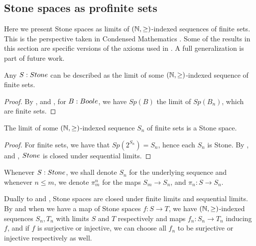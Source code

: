 
\subsection{Stone spaces as profinite sets}
Here we present Stone spaces as limits of $(\mathbb{N},\geq)$-indexed sequences of finite sets. 
This is the perspective taken in Condensed Mathematics \cite{Condensed,Dagur,Scholze}.
Some of the results in this section are specific versions of the axioms used in 
\cite{bc24}. A full generalization is part of future work. 
\begin{lemma}
  Any $S:\Stone$ can be described as the limit of some $(\mathbb{N},\geq)$-indexed sequence of 
  finite sets. 
\end{lemma}
\begin{proof}
  By ,  and , 
  for $B:\Boole$, we have $Sp(B)$ the limit of $Sp(B_n)$, which are finite sets. 
\end{proof}
\begin{lemma}\label{StoneAreProfinite}
  The limit of some $(\mathbb{N},\geq)$-indexed sequence $S_n$ of finite sets is a Stone space. 
\end{lemma}
\begin{proof}
  For finite sets, we have that $Sp(2^{S_n}) = S_n$, hence each $S_n$ is Stone. 
  By ,  and , 
  $\Stone$ is closed under sequential limits.
\end{proof}
\begin{remark}
  Whenever $S:\Stone$, we shall denote $S_n$ for the underlying sequence 
  and whenever $n\leq m$, we denote $\pi_m^n$ for the maps $S_m \to S_n$, 
  and $\pi_n:S\to S_n$. 
\end{remark}
\begin{remark}\label{StoneClosedUnderPullback}\label{ProFiniteMapsFactorization}
  Dually to  and , 
  Stone spaces are closed under finite limits and sequential limits.
  By  and 
   when we have a map of Stone spaces $f:S\to T$, 
  we have $(\mathbb{N},\geq)$-indexed sequences $S_n,T_n$ with limits $S$ and $T$ respectively
  and maps $f_n:S_n\to T_n$ inducing $f$, and if $f$ is surjective or injective, we 
  can choose all $f_n$ to be surjective or injective respectively as well. 
\end{remark}
